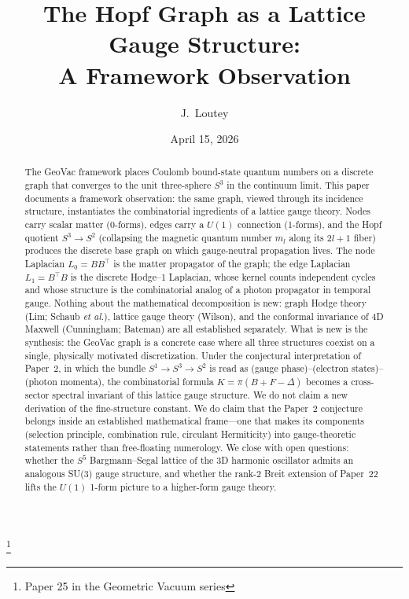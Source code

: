 \documentclass[aps,pra,twocolumn,superscriptaddress,longbibliography]{revtex4-2}
\begin{document}
\title{The Hopf Graph as a Lattice Gauge Structure:\\
A Framework Observation}
\thanks{Paper 25 in the Geometric Vacuum series}

\author{J.~Loutey}

\date{April 15, 2026}


\begin{abstract}
The GeoVac framework places Coulomb bound-state quantum numbers on a
discrete graph that converges to the unit three-sphere $S^3$ in the
continuum limit.  This paper documents a framework observation: the
same graph, viewed through its incidence structure, instantiates the
combinatorial ingredients of a lattice gauge theory.  Nodes carry
scalar matter (0-forms), edges carry a $U(1)$ connection (1-forms),
and the Hopf quotient $S^3 \to S^2$ (collapsing the magnetic quantum
number $m_l$ along its $2l+1$ fiber) produces the discrete base graph
on which gauge-neutral propagation lives.  The node Laplacian
$L_0 = B B^{\top}$ is the matter propagator of the graph; the edge
Laplacian $L_1 = B^{\top} B$ is the discrete Hodge--1 Laplacian, whose
kernel counts independent cycles and whose structure is the
combinatorial analog of a photon propagator in temporal gauge.
Nothing about the mathematical decomposition is new: graph Hodge
theory (Lim; Schaub \emph{et al.}), lattice gauge theory (Wilson), and
the conformal invariance of 4D Maxwell (Cunningham; Bateman) are all
established separately.  What is new is the synthesis: the GeoVac
graph is a concrete case where all three structures coexist on a
single, physically motivated discretization.  Under the conjectural
interpretation of Paper~2, in which the bundle
$S^1 \to S^3 \to S^2$ is read as
(gauge phase)--(electron states)--(photon momenta), the
combinatorial formula $K = \pi(B + F - \Delta)$ becomes a
cross-sector spectral invariant of this lattice gauge structure.  We
do not claim a new derivation of the fine-structure constant.  We do
claim that the Paper~2 conjecture belongs inside an established
mathematical frame---one that makes its components
(selection principle, combination rule, circulant Hermiticity) into
gauge-theoretic statements rather than free-floating numerology.  We
close with open questions: whether the $S^5$ Bargmann--Segal lattice
of the 3D harmonic oscillator admits an analogous SU(3) gauge
structure, and whether the rank-2 Breit extension of Paper~22 lifts
the $U(1)$ 1-form picture to a higher-form gauge theory.
\end{abstract}
\end{document}
